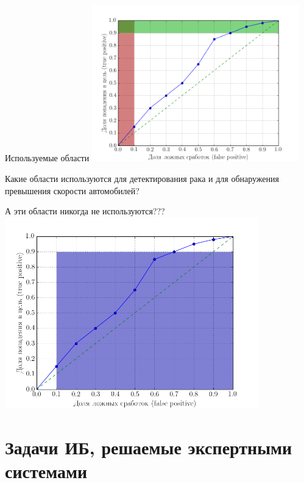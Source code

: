 \documentclass{beamer}
\begin{document}
  \begin{frame}{Используемые области}
	\includegraphics[width=9cm]{../pic/roc_example_2.png}
   \small
   
	Какие области используются для детектирования рака 
	и для обнаружения превышения скорости
	автомобилей?
   \end{frame}


  \begin{frame}{А эти области никогда не используются???}
	\includegraphics[width=11cm]{../pic/roc_example_3.png}

	\end{frame}

  \section{Задачи ИБ, решаемые экспертными системами}\label{section:is_tasks}
	
\end{document}
